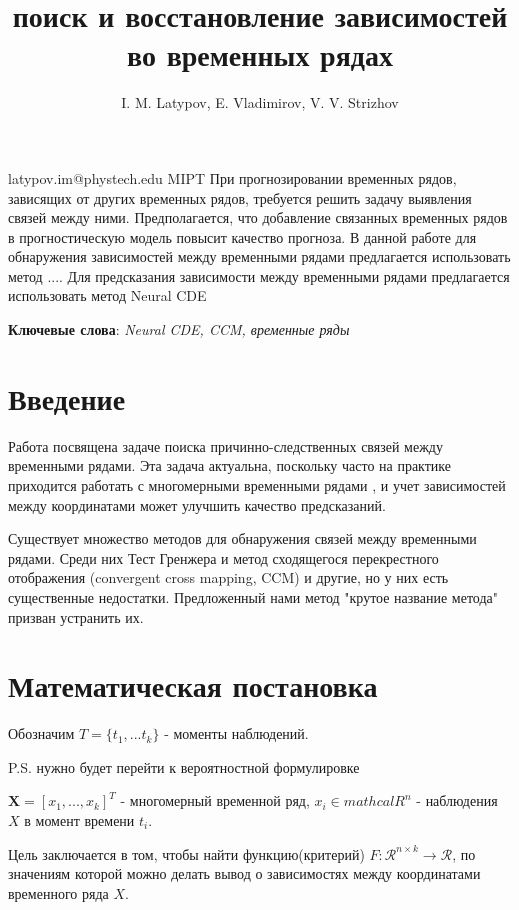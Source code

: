 \documentclass[12pt, twoside]{article}
\begin{document}
\title
	[поиск и восстановление зависимостей во временных рядах]
	{поиск и восстановление зависимостей во временных рядах}
\author
	[I. M. Latypov]
	{I. M. Latypov, E. Vladimirov, V. V. Strizhov}
\email
	{latypov.im@phystech.edu}
\organization	
	{MIPT}	
\abstract
	{
		При прогнозировании временных рядов, зависящих от других временных рядов, требуется решить задачу выявления связей между ними.
		Предполагается, что добавление связанных временных рядов в прогностическую модель повысит качество прогноза. В данной работе для
		обнаружения зависимостей между временными рядами предлагается использовать метод .... Для предсказания зависимости между временными 
		рядами предлагается использовать метод Neural CDE
		}
\bigskip
\noindent

\maketitle
\textbf{Ключевые слова}: \emph{Neural CDE, CCM, временные ряды}

\section{Введение}
	Работа посвящена задаче поиска причинно-следственных связей между временными рядами.
	Эта задача актуальна, поскольку часто на практике приходится работать с многомерными временными рядами \citep{dataset_mlru}, и учет зависимостей между координатами может улучшить качество предсказаний. 
		
	Существует множество методов для обнаружения связей между временными рядами. Среди них Тест Гренжера и метод сходящегося перекрестного отображения
	(convergent cross mapping, CCM) и другие, но у них есть существенные недостатки. Предложенный нами метод "крутое название метода" призван устранить их.
	
\section{Математическая постановка}
	Обозначим $T = \{t_1, ... t_k\}$ - моменты наблюдений.
	
	P.S. нужно будет перейти к вероятностной формулировке
	
	$\mathbf{X} = [x_1, ... , x_k]^T$ - многомерный временной ряд, $x_i \in mathcal{R}^n$ - наблюдения $X$ в момент времени $t_i$.

		Цель заключается в том, чтобы найти функцию(критерий) $F: \mathcal{R}^{n \times k } \rightarrow \mathcal R$, по значениям которой можно делать вывод о зависимостях между координатами временного ряда $X$.
	
\end{document}
